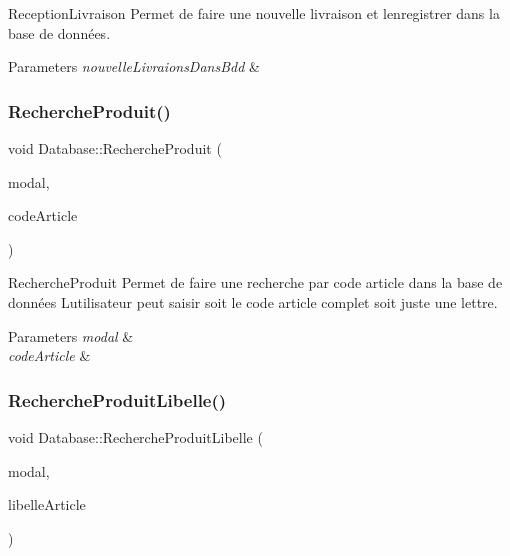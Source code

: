 Reception\+Livraison Permet de faire une nouvelle livraison et l\textquotesingle{}enregistrer dans la base de données. 


\begin{DoxyParams}{Parameters}
{\em nouvelle\+Livraions\+Dans\+Bdd} & \\
\hline
\end{DoxyParams}
\mbox{\label{class_database_a5f430ffd8bbe1b0bc061ff68fa1cbf6c}} 
\subsubsection{\texorpdfstring{Recherche\+Produit()}{RechercheProduit()}}
{\footnotesize\ttfamily void Database\+::\+Recherche\+Produit (\begin{DoxyParamCaption}\item[{Q\+Sql\+Query\+Model $\ast$}]{modal,  }\item[{Q\+String}]{code\+Article }\end{DoxyParamCaption})}



Recherche\+Produit Permet de faire une recherche par code article dans la base de données L\textquotesingle{}utilisateur peut saisir soit le code article complet soit juste une lettre. 


\begin{DoxyParams}{Parameters}
{\em modal} & \\
\hline
{\em code\+Article} & \\
\hline
\end{DoxyParams}
\mbox{\label{class_database_a445a4944389eda1e1e9c390cdbccae04}} 
\subsubsection{\texorpdfstring{Recherche\+Produit\+Libelle()}{RechercheProduitLibelle()}}
{\footnotesize\ttfamily void Database\+::\+Recherche\+Produit\+Libelle (\begin{DoxyParamCaption}\item[{Q\+Sql\+Query\+Model $\ast$}]{modal,  }\item[{Q\+String}]{libelle\+Article }\end{DoxyParamCaption})}



